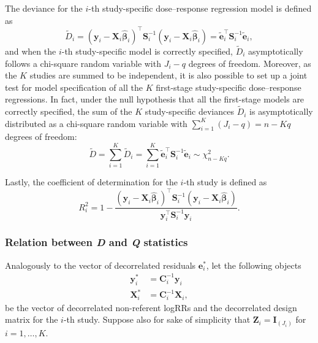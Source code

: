 The deviance for the $i$-th study-specific dose--response regression model is defined as
\begin{equation*}
\tilde{D}_i = \left(\mathbf{y}_i - \mathbf{X}_i \hat{\boldsymbol{\beta}}_i\right)^\top \mathbf{S}_i^{-1} \left(\mathbf{y}_i - \mathbf{X}_i \hat{\boldsymbol{\beta}}_i\right) = \tilde{\mathbf{e}}_i^\top \mathbf{S}_i^{-1} \tilde{\mathbf{e}}_i,
\end{equation*}
and when the $i$-th study-specific model is correctly specified, $\tilde{D}_i$ asymptotically follows a chi-square random variable with $J_i-q$ degrees of freedom. Moreover, as the $K$ studies are summed to be independent, it is also possible to set up a joint test for model specification of all the $K$ first-stage study-specific dose--response regressions. In fact, under the null hypothesis that all the first-stage models are correctly specified, the sum of the $K$ study-specific deviances $\tilde{D}_i$ is asymptotically distributed as a chi-square random variable with $\sum_{i=1}^K(J_i - q) = n-Kq$ degrees of freedom:
\begin{equation}
\tilde{D} = \sum_{i=1}^K \tilde{D}_i = \sum_{i=1}^{K} \tilde{\mathbf{e}}_i^\top \mathbf{S}_i^{-1} \tilde{\mathbf{e}}_i \sim \chi_{n-Kq}^2.
\label{eq:dtilde}
\end{equation}

Lastly, the coefficient of determination for the $i$-th study is defined as
\begin{equation*}
R_i^2 = 1- \frac{\left(\mathbf{y}_i - \mathbf{X}_i  \hat{\boldsymbol{\beta}}_i\right)^\top \mathbf{S}_i^{-1} \left(\mathbf{y}_i - \mathbf{X}_i  \hat{\boldsymbol{\beta}}_i\right)}{ \mathbf{y}_i^\top \mathbf{S}_i^{-1} \mathbf{y}_i}.
\end{equation*}


\subsubsection{Relation between \textit{D} and  \textit{Q} statistics}

Analogously to the vector of decorrelated residuals $\mathbf{e}_i^*$, let the following objects
\begin{align*}
\mathbf{y}_i^* &= \mathbf{C}_i^{-1}  \mathbf{y}_i \\
\mathbf{X}_i^* &= \mathbf{C}_i^{-1}  \mathbf{X}_i,
\end{align*}
be the vector of decorrelated non-referent logRRs and the decorrelated design matrix for the $i$-th study. Suppose also for sake of simplicity that $\mathbf{Z}_i=\mathbf{I}_{(J_i)}$ for $i=1,\ldots,K$. 

